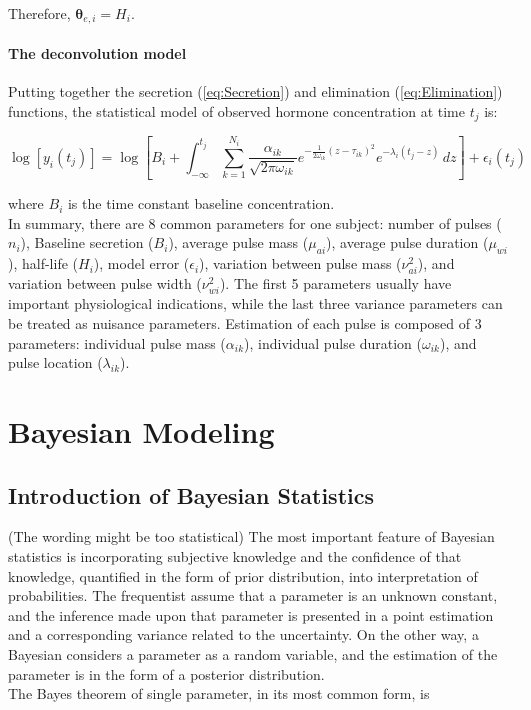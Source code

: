 \documentclass[11pt]{book}
\newcommand{\beq}{\begin{equation}}
\newcommand{\eeq}{\end{equation}}
\begin{document}

Therefore, $\boldsymbol{\theta}_{e,i} = H_i$.

\subsubsection{The deconvolution model} Putting together the secretion (\ref{eq:Secretion}) and elimination (\ref{eq:Elimination}) functions, the statistical model of observed hormone concentration at time $t_j$ is:


\beq
\log[y_i(t_j)]=\log\left[B_i + \int_{-\infty}^{t_j} \sum_{k=1}^{N_i}  \frac{\alpha_{ik}}{\sqrt{2\pi\omega_{ik}}}e^{-\frac{1}{2\omega_{ik}}(z-\tau_{ik})^2} e^{-\lambda_i(t_j-z)}\,dz\right]+\epsilon_i(t_j)
\label{eq:DeconModel}
\eeq


\noindent where $B_i$ is the time constant baseline concentration.\\
In summary, there are 8 common parameters for one subject: number of pulses ($n_i$), Baseline secretion ($B_i$), average pulse mass ($\mu_{ai}$), average pulse duration ($\mu_{wi}$), half-life ($H_i$), model error ($\epsilon_i$), variation between pulse mass ($\nu^2_{ai}$), and variation between pulse width ($\nu^2_{wi}$). The first 5 parameters usually have important physiological indications, while the last three variance parameters can be treated as nuisance parameters.  Estimation of each pulse is composed of 3 parameters: individual pulse mass ($\alpha_{ik}$), individual pulse duration ($\omega_{ik}$), and pulse location ($\lambda_{ik}$).
\chapter{Bayesian Modeling}
\section{Introduction of Bayesian Statistics}
(The wording might be too statistical)
The most important feature of Bayesian statistics is incorporating subjective knowledge and the confidence of that knowledge, quantified in the form of prior distribution, into interpretation of probabilities. The frequentist assume that a parameter is an unknown constant, and the inference made upon that parameter is presented in a point estimation and a corresponding variance related to the uncertainty. On the other way, a Bayesian considers a parameter as a random variable, and the estimation of the parameter is in the form of a posterior distribution.\\
The Bayes theorem of single parameter, in its most common form, is
\end{document}
